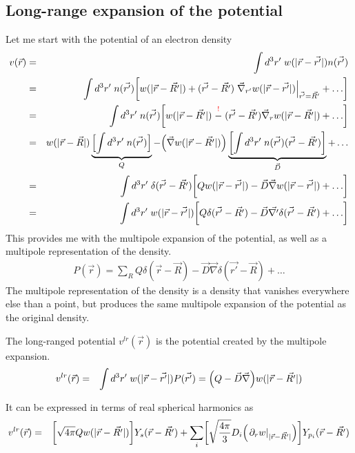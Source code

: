 \documentclass[11pt,a4paper]{report}
\begin{document}
\subsection{Long-range expansion of the potential}
Let me start with the potential of an electron density
\begin{eqnarray}
v(\vec{r})&=&
\int d^3r'\; w(|\vec{r}-\vec{r'}|)n(\vec{r'})
\nonumber\\
%
%
&=&\int d^3r'\; n(\vec{r'})
\biggl[
w(|\vec{r}-\vec{R'}|)
+(\vec{r'}-\vec{R'})
\left.\vec{\nabla}_{r'}w(|\vec{r}-\vec{r'}|)
\right|_{\vec{r'}=\vec{R'}}+\ldots\biggr]
\nonumber\\
%
%
&=&\int d^3r'\; n(\vec{r'})
\biggl[
w(|\vec{r}-\vec{R'}|)\stackrel{\textcolor{red}{!}}{-}(\vec{r'}-\vec{R'})
\vec{\nabla}_rw(|\vec{r}-\vec{R'}|)+\ldots\biggr]
\nonumber\\
%
%
&=&
w(|\vec{r}-\vec{R}|)
\underbrace{\Bigl[\int d^3r'\; n(\vec{r'})\Bigr]}_{Q}
-\Bigl(\vec{\nabla}w(|\vec{r}-\vec{R'}|)\Bigr)
\underbrace{
\biggl[\int d^3r'\; n(\vec{r'})(\vec{r'}-\vec{R'})\biggr]
}_{\vec{D}}
+\ldots
\nonumber\\
%
%
&=&
\int d^3r'\; \delta(\vec{r'}-\vec{R'})
\biggl[
Q  w(|\vec{r}-\vec{r'}|)
-\vec{D}\vec{\nabla}w(|\vec{r}-\vec{r'}|)
+\ldots\biggr]
\nonumber\\
%
%
&=&
\int d^3r'\; 
w(|\vec{r}-\vec{r'}|)
\biggl[
Q \delta(\vec{r'}-\vec{R'}) 
-\vec{D}\vec{\nabla'}\delta(\vec{r'}-\vec{R'})
+\ldots\biggr]
\end{eqnarray}
This provides me with the multipole expansion of the potential, as
well as a multipole representation of the density. 
\begin{eqnarray}
P(\vec{r})=\sum_R
Q \delta(\vec{r}-\vec{R}) 
-\vec{D}\vec{\nabla}\delta(\vec{r'}-\vec{R})
+\ldots
\end{eqnarray}
The multipole representation of the density is a density that vanishes
everywhere else than a point, but produces the same multipole
expansion of the potential as the original density.

The long-ranged potential $v^{lr}(\vec{r})$ is the potential created
by the multipole expansion.
\begin{eqnarray}
v^{lr}(\vec{r})&=&
\int d^3r'\; w(|\vec{r}-\vec{r'}|)P(\vec{r'})
=
\Bigl(Q-\vec{D}\vec{\nabla}\Bigr)w(|\vec{r}-\vec{R'}|)
\end{eqnarray}

It can be expressed in terms of real spherical harmonics as
\begin{eqnarray}
v^{lr}(\vec{r})&=&
\biggl[
\sqrt{4\pi}Q w(|\vec{r}-\vec{R'}|)
\biggr] 
Y_s(\vec{r}-\vec{R'})
+\sum_i
\biggl[
\sqrt{\frac{4\pi}{3}} D_i
\Bigl(\left.\partial_r w\right|_{|\vec{r}-\vec{R'}|}\Bigr) 
\biggr]
Y_{p_i}(\vec{r}-\vec{R'})
\end{eqnarray}
\end{document}
